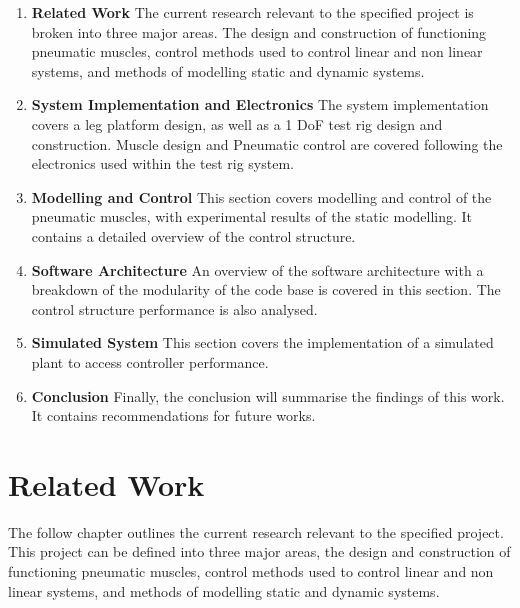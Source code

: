 \documentclass[11pt,a4paper]{article}
\begin{document}
\begin{enumerate}
\item \textbf{Related Work} The current research relevant to the specified project is broken into three major areas. The design and construction of functioning pneumatic muscles, control methods used to control linear and non linear systems, and methods of modelling static and dynamic systems.

\item \textbf{System Implementation and Electronics}
The system implementation covers a leg platform design, as well as a 1 DoF test rig design and construction. Muscle design and Pneumatic control are covered following the electronics used within the test rig system.

\item \textbf{Modelling and Control}
This section covers modelling and control of the pneumatic muscles, with experimental results of the static modelling. It contains a detailed overview of the control structure.

\item \textbf{Software Architecture}
An overview of the software architecture with a breakdown of the modularity of the code base is covered in this section. The control structure performance is also analysed.

\item \textbf{Simulated System}
This section covers the implementation of a simulated plant to access controller performance.

\item \textbf{Conclusion} 
Finally, the conclusion will summarise the findings of this work. It contains recommendations for future works.

\end{enumerate}

\clearpage
\section{Related Work}
\label{sec:related_work}

The follow chapter outlines the current research relevant to the specified project. This project can be defined into three major areas, the design and construction of functioning pneumatic muscles, control methods used to control linear and non linear systems, and methods of modelling static and dynamic systems. 
\end{document}
